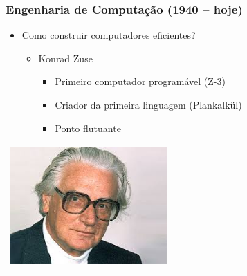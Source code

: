 \documentclass[aspectratio=169]{beamer}
\begin{document}
	\begin{frame}
		\frametitle{Engenharia de Computação (1940 – hoje)}
		\begin{itemize}
			\item Como construir computadores eficientes?
			\begin{itemize}
				\item Konrad Zuse
				\begin{itemize}
					\item Primeiro computador programável (Z-3)
					\item Criador da primeira linguagem (Plankalkül)
					\item Ponto flutuante
				\end{itemize}
			\end{itemize}
		\end{itemize}
		
		\begin{table}
			\centering
			\begin{tabular}{c}				
				\includegraphics[height=4.5cm, keepaspectratio]{../figs/cap01/zuse.png} \\		
				
			\end{tabular}
		\end{table}
	\end{frame}
\end{document}
